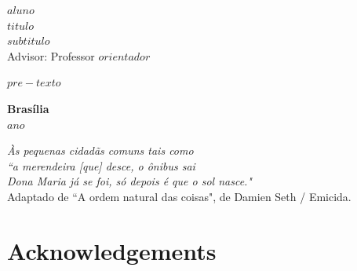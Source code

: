 \documentclass[12pt, a4paper, twoside]{article}
\numberwithin{equation}{subsection} %
\newcommand{\titulo}{$titulo$ \\ $subtitulo$}
\newcommand{\autor}{$aluno$}
\newcommand{\orientador}{ Professor $orientador$ }
\newcommand{\coorientador}{ Prof(a). $coorientador$ }
\begin{document}

\thispagestyle{empty}

\begin{center}
\textbf{\autor} \\
\vspace{5cm}
\textbf{\titulo} \\
\vspace{3cm}
\small
Advisor: \orientador \\
\end{center}


\vspace*{3cm}

\begin{flushright}
\begin{minipage}{7.5cm}
 \parbox[t]{7.5cm}{$pre-texto$}
\end{minipage}
\end{flushright}

\vspace{5cm}

\begin{center}
{\bf{Brasília} \\ }
\bf{$ano$}
\end{center}




\newpage %
\thispagestyle{empty} %


\begin{flushright} %
\textit{Às pequenas cidadãs comuns tais como \\
        ``a merendeira [que] desce, o ônibus sai \\
        Dona Maria já se foi, só depois é que o sol nasce."}\\
\vspace{1cm}        
Adaptado de ``A ordem natural das coisas", de Damien Seth / Emicida.
\end{flushright}


\setcounter{page}{3} 


\newpage %

\doublespacing

\section*{Acknowledgements}
\end{document}
